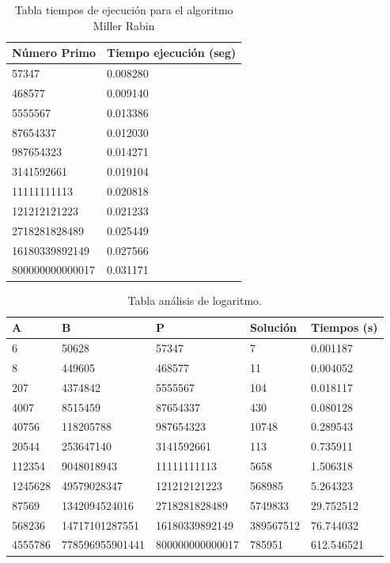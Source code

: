 \begin{table}[htbp]
	\begin{center}
		\begin{tabular}{|l|l|}
			\hline
			\rowcolor{LightCyan}
			Número Primo & Tiempo ejecución (seg) \\ \hline
			57347&  0.008280 \\ \hline 
			468577&  0.009140 \\ \hline 
			5555567&  0.013386 \\ \hline 
			87654337&  0.012030 \\ \hline 
			987654323&  0.014271 \\ \hline 
			3141592661&  0.019104 \\ \hline 
			11111111113&  0.020818 \\ \hline 
			121212121223&  0.021233 \\ \hline 
			2718281828489&  0.025449 \\ \hline 
			16180339892149&  0.027566 \\ \hline 
			800000000000017&  0.031171 \\ \hline 
		\end{tabular}
		\caption{Tabla tiempos de ejecución para el algoritmo Miller Rabin}
		\label{tabla:millerrabin}
	\end{center}
\end{table}


\begin{table}[h]
	\begin{center}
		\begin{tabular}{|l|l|l|l|l|}
			\hline 
			\rowcolor{LightCyan}
			A & B & P & Solución & Tiempos (s) \\ \hline
			6 & 50628 & 57347& 7 & 0.001187 \\ \hline 
			8 & 449605 & 468577& 11 & 0.004052 \\ \hline
			207 & 4374842 & 5555567& 104 & 0.018117 \\ \hline
			4007 & 8515459 & 87654337& 430 & 0.080128\\ \hline
			40756 & 118205788 & 987654323& 10748 & 0.289543\\ \hline
			20544 & 253647140 & 3141592661& 113 & 0.735911\\ \hline
			112354 & 9048018943 & 11111111113& 5658 & 1.506318\\ \hline
			1245628 & 49579028347 & 121212121223& 568985 & 5.264323\\ \hline
			87569 & 1342094524016 & 2718281828489& 5749833 & 29.752512\\ \hline
			568236 & 14717101287551 & 16180339892149& 389567512 & 76.744032\\ \hline
			4555786 & 778596955901441 & 800000000000017& 785951 & 612.546521\\ \hline
		\end{tabular}
		\caption{Tabla análisis de logaritmo.}
		\label{tabla:compleja}
	\end{center}
\end{table}

